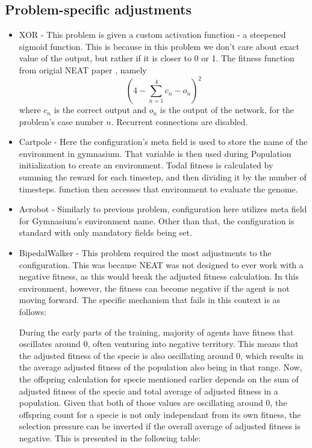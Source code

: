 \documentclass{article}
\begin{document}
        \subsection{Problem-specific adjustments}
        \begin{itemize}
            \item XOR - This problem is given a custom activation function - a steepened sigmoid function.
            This is because in this problem we don't care about exact value of the output, but rather if it is closer to 0 or 1.
            The fitness function from origial NEAT paper \cite{originalNeat}, namely $$(4 - \sum_{n=1}^{4}c_n-o_n)^2$$
            where $c_n$ is the correct output and $o_n$ is the output of the network, for the problem's case number $n$.
            Recurrent connections are disabled.
            \item Cartpole - Here the configuration's meta field is used to store the name of the environment in gymnasium. That 
            variable is then used during Population initialization to create an environment.
            Todal fitness is calculated by summing the reward for each timestep, and then dividing it by the number of timesteps.
             function then accesses that 
            environment to evaluate the genome.  
            \item Acrobot - Similarly to previous problem, configuration here utilizes meta field for Gymnasium's environment name. 
            Other than that, the configuration is standard with only mandatory fields being set.
            \item BipedalWalker - This problem required the most adjustments to the configuration.
            This was because NEAT was not designed to ever work with a negative fitness, as this would break the adjusted fitness calculation.
            In this environment, however, the fitness can become negative if the agent is not moving forward.
            The specific mechanism that fails in this context is as follows:

            During the early parts of the training, majority of agents have fitness that oscillates around 0, often venturing into negative territory.
            This means that the adjusted fitness of the specie is also oscillating around 0, which results in the average adjusted fitness of the population 
            also being in that range. Now, the offspring calculation for specie mentioned earlier depends on the sum of adjusted fitness of the specie and
            total average of adjusted fitness in a population. Given that both of those values are oscillating around 0, the offspring count for a specie
            is not only independant from its own fitness, the selection pressure can be inverted if the overall average of adjusted fitness is negative.
            This is presented in the following table:


\end{itemize}
\end{document}
